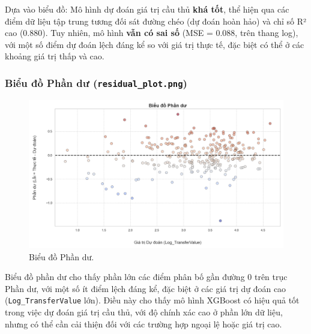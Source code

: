 \documentclass[12pt, a4paper]{report}
\begin{document}
Dựa vào biểu đồ: Mô hình dự đoán giá trị cầu thủ \textbf{khá tốt}, thể hiện qua các điểm dữ liệu tập trung tương đối sát đường chéo (dự đoán hoàn hảo) và chỉ số R² cao (0.880).
Tuy nhiên, mô hình \textbf{vẫn có sai số} (MSE = 0.088, trên thang log), với một số điểm dự đoán lệch đáng kể so với giá trị thực tế, đặc biệt có thể ở các khoảng giá trị thấp và cao.

\subsubsection*{Biểu đồ Phần dư (\texttt{residual\_plot.png})}
\begin{figure}[H]
    \centering
    \includegraphics[width=\textwidth]{residual_plot.png}
    \caption{Biểu đồ Phần dư.}
    \label{fig:residual_plot}
\end{figure}

Biểu đồ phần dư cho thấy phần lớn các điểm phân bố gần đường 0 trên trục Phần dư, với một số ít điểm lệch đáng kể, đặc biệt ở các giá trị dự đoán cao (\texttt{Log\_TransferValue} lớn).
Điều này cho thấy mô hình XGBoost có hiệu quả tốt trong việc dự đoán giá trị cầu thủ, với độ chính xác cao ở phần lớn dữ liệu, nhưng có thể cần cải thiện đối với các trường hợp ngoại lệ hoặc giá trị cao.
\end{document}
